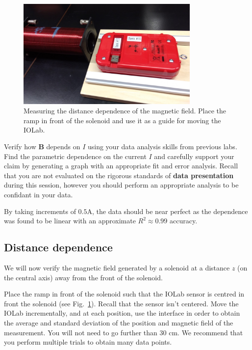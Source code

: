 \documentclass[12pt]{report}
\begin{document}
\begin{figure}[h]
\centering
\includegraphics[width=0.8\textwidth]{lab3-sessiona-ramp}
\caption{Measuring the distance dependence of the magnetic field. Place the ramp in front of the solenoid and use it as a guide for moving the IOLab.}
\label{Fig:lab3-sessiona-ramp}
\end{figure}

{\color{blue}Verify how $\mathbf{B}$ depends on $I$ using your data analysis skills from previous labs. Find the parametric dependence on the current $I$ and carefully support your claim by generating a graph with an appropriate fit and error analysis.
Recall that you are not evaluated on the rigorous standards of \textbf{data presentation} during this session, however you should perform an appropriate analysis to be confidant in your data. }

\begin{tcolorbox}
By taking increments of $0.5$A, the data should be near perfect as the dependence was found to be linear with an approximate $R^2 \approx 0.99$ accuracy.
\end{tcolorbox}

\subsection{Distance dependence}
We will now verify the magnetic field generated by a solenoid at a distance $z$ (on the central axis) away from the front of the solenoid.

Place the ramp in front of the solenoid such that the IOLab sensor is centred in front the solenoid (see Fig.~\ref{Fig:lab3-sessiona-ramp}). 
Recall that the sensor isn't centered. Move the IOLab incrementally, and {\color{blue}at each position, use the interface in order to obtain the average and standard deviation of the position and magnetic field of the measurement. }
You will not need to go further than 30 cm. We recommend that you perform multiple trials to obtain many data points.
\end{document}

